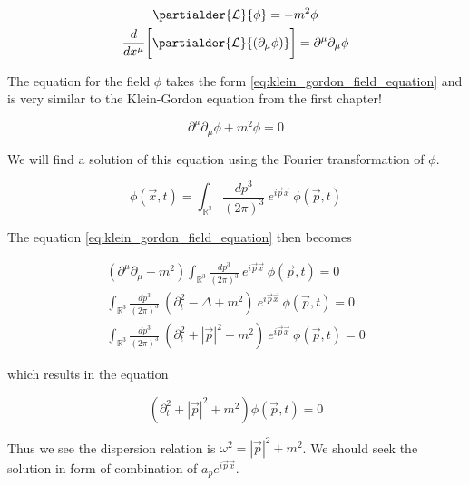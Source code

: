 \begin{equation*}
    \begin{gathered}
        \partialder{\mathcal{L}}{\phi} = - m^2 \phi \\
        \frac{d}{dx^{\mu}} \bigg[ \partialder{\mathcal{L}}{(\partial_{\mu} \phi)} \bigg] = \partial^{\mu} \partial_{\mu} \phi
    \end{gathered}
\end{equation*}

The equation for the field $\phi$ takes the form \ref{eq:klein_gordon_field_equation} and is very similar to the Klein-Gordon
equation from the first chapter!

\begin{equation}
    \label{eq:klein_gordon_field_equation}
    \partial^{\mu} \partial_{\mu} \phi + m^2 \phi = 0
\end{equation}

We will find a solution of this equation using the Fourier transformation of $\phi$.

\begin{equation}
    \phi (\vec{x}, t) = \int_{\mathbb{R}^{3}} \frac{dp^{3}}{(2 \pi)^{3}} \ e^{i \vec{p} \vec{x}} \ \phi (\vec{p}, t)
\end{equation}

The equation \ref{eq:klein_gordon_field_equation} then becomes

\begin{equation*}
    \begin{gathered}
        (\partial^{\mu} \partial_{\mu} + m^2) \int_{\mathbb{R}^{3}} \frac{dp^{3}}{(2 \pi)^{3}} \ e^{i \vec{p} \vec{x}} \ \phi (\vec{p}, t) = 0 \\
        \int_{\mathbb{R}^{3}} \frac{dp^{3}}{(2 \pi)^{3}} \ (\partial_{t}^{2} - \Delta + m^2) \ e^{i \vec{p} \vec{x}} \ \phi (\vec{p}, t) = 0 \\
        \int_{\mathbb{R}^{3}} \frac{dp^{3}}{(2 \pi)^{3}} \ (\partial_{t}^{2} + | \vec{p} |^{2} + m^2) \ e^{i \vec{p} \vec{x}} \ \phi (\vec{p}, t) = 0
    \end{gathered}
\end{equation*}

which results in the equation

\begin{equation*}
    (\partial_{t}^{2} + | \vec{p} |^{2} + m^2) \phi (\vec{p}, t) = 0
\end{equation*}

Thus we see the dispersion relation is $\omega^{2} = | \vec{p} |^{2} + m^2$. We should seek the solution in form of combination of $a_{p} e^{i \vec{p} \vec{x}}$.

